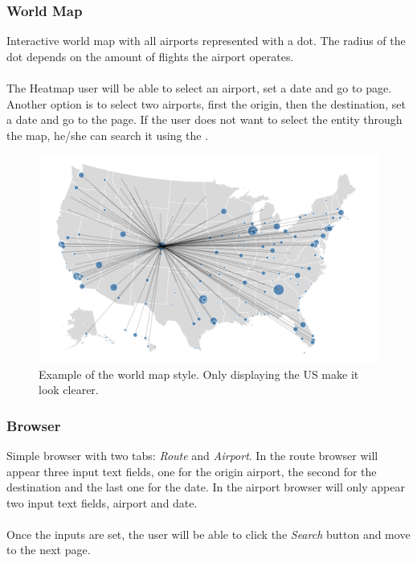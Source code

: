 \subsubsection*{World Map}

Interactive world map with all airports represented with a dot. The radius of the dot depends on the amount of flights the airport operates.
\\\\
The Heatmap user will be able to select an airport, set a date and go to  page. Another option is to select two airports, first the origin, then the destination, set a date and go to the  page. If the user does not want to select the entity through the map, he/she can search it using the .

\begin{figure}[H]
\centering
\includegraphics[scale=0.25]{resources/us-map-example01.png}
\caption{Example of the world map style. Only displaying the US make it look clearer.}
\end{figure}

\subsubsection*{Browser} \label{browser}

Simple browser with two tabs: \textit{Route} and \textit{Airport}. In the route browser will appear three input text fields, one for the origin airport, the second for the destination and the last one for the date. In the airport browser will only appear two input text fields, airport and date.
\\\\
Once the inputs are set, the user will be able to click the \textit{Search} button and move to the next page.


